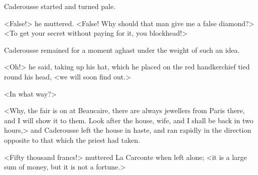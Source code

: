  Caderousse started and turned pale. 

 <False!> he muttered. <False! Why should that man give me a false diamond?>  <To get your secret without paying for it, you blockhead!> 

 Caderousse remained for a moment aghast under the weight of such an idea. 

 <Oh!> he said, taking up his hat, which he placed on the red handkerchief tied round his head, <we will soon find out.> 

 <In what way?> 

 <Why, the fair is on at Beaucaire, there are always jewellers from Paris there, and I will show it to them. Look after the house, wife, and I shall be back in two hours,> and Caderousse left the house in haste, and ran rapidly in the direction opposite to that which the priest had taken. 

 <Fifty thousand francs!> muttered La Carconte when left alone; <it is a large sum of money, but it is not a fortune.> 